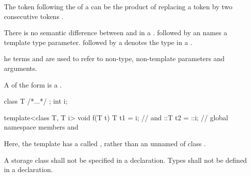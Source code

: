 \documentclass{wg21}
\begin{document}
\begin{note}
    The \tcode{>} token following the
     of a
    can be the product of replacing a
    \tcode{>>} token by two consecutive \tcode{>}
    tokens .
\end{note}

\pnum
There is no semantic difference between
and
in a
.
followed by an
names a template type parameter.
followed by a
denotes the type in a  .


\begin{removedblock}
\begin{wfootnote}
    he terms
    and
    are used to refer to non-type, non-template parameters and arguments.
\end{wfootnote}
\end{removedblock}

A  of the form
  is a .
\begin{example}
    \begin{codeblock}
        class T { /*...*/ };
        int i;

        template<class T, T i> void f(T t) {
            T t1 = i;         //   and 
            ::T t2 = ::i;     // global namespace members  and 
        }
    \end{codeblock}
    Here, the template  has a 
    called , rather than an unnamed  of class .
\end{example}
A storage class shall not be specified in a
declaration.
Types shall not be defined in a 
declaration.
\end{document}
